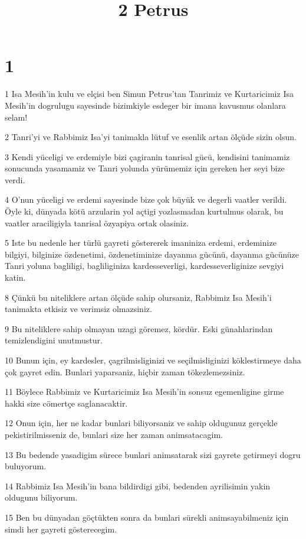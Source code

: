 

\title{2 Petrus}


\chapter{1}

\par 1 Isa Mesih'in kulu ve elçisi ben Simun Petrus'tan Tanrimiz ve Kurtaricimiz Isa Mesih'in dogrulugu sayesinde bizimkiyle esdeger bir imana kavusmus olanlara selam!
\par 2 Tanri'yi ve Rabbimiz Isa'yi tanimakla lütuf ve esenlik artan ölçüde sizin olsun.
\par 3 Kendi yüceligi ve erdemiyle bizi çagiranin tanrisal gücü, kendisini tanimamiz sonucunda yasamamiz ve Tanri yolunda yürümemiz için gereken her seyi bize verdi.
\par 4 O'nun yüceligi ve erdemi sayesinde bize çok büyük ve degerli vaatler verildi. Öyle ki, dünyada kötü arzularin yol açtigi yozlasmadan kurtulmus olarak, bu vaatler araciligiyla tanrisal özyapiya ortak olasiniz.
\par 5 Iste bu nedenle her türlü gayreti göstererek imaniniza erdemi, erdeminize bilgiyi, bilginize özdenetimi, özdenetiminize dayanma gücünü, dayanma gücünüze Tanri yoluna bagliligi, bagliliginiza kardesseverligi, kardesseverliginize sevgiyi katin.
\par 8 Çünkü bu niteliklere artan ölçüde sahip olursaniz, Rabbimiz Isa Mesih'i tanimakta etkisiz ve verimsiz olmazsiniz.
\par 9 Bu niteliklere sahip olmayan uzagi göremez, kördür. Eski günahlarindan temizlendigini unutmustur.
\par 10 Bunun için, ey kardesler, çagrilmisliginizi ve seçilmisliginizi köklestirmeye daha çok gayret edin. Bunlari yaparsaniz, hiçbir zaman tökezlemezsiniz.
\par 11 Böylece Rabbimiz ve Kurtaricimiz Isa Mesih'in sonsuz egemenligine girme hakki size cömertçe saglanacaktir.
\par 12 Onun için, her ne kadar bunlari biliyorsaniz ve sahip oldugunuz gerçekle pekistirilmisseniz de, bunlari size her zaman animsatacagim.
\par 13 Bu bedende yasadigim sürece bunlari animsatarak sizi gayrete getirmeyi dogru buluyorum.
\par 14 Rabbimiz Isa Mesih'in bana bildirdigi gibi, bedenden ayrilisimin yakin oldugunu biliyorum.
\par 15 Ben bu dünyadan göçtükten sonra da bunlari sürekli animsayabilmeniz için simdi her gayreti gösterecegim.
